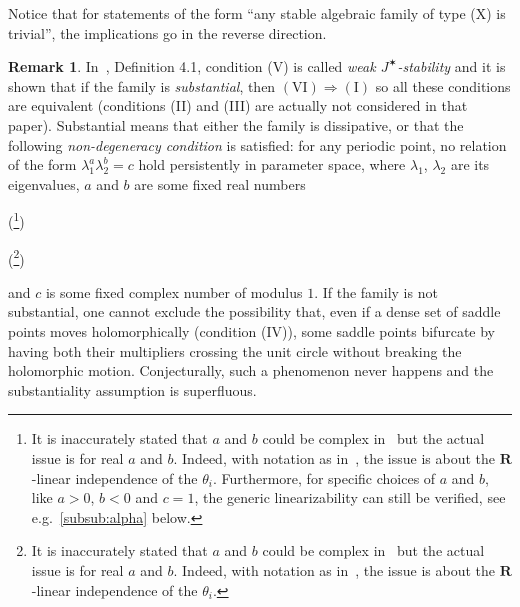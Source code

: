 \documentclass[oneside, 12pt]{amsart}
\newcommand{\abs}[1]{\left\vert#1\right\vert}
\newcommand{\jstar}{J^\varstar}
\newcommand{\R}{\mathbf{R}}
\theoremstyle{plain}
\theoremstyle{definition}
\newtheorem{rem}[thm]{Remark}
\numberwithin{equation}{section}       %
\numberwithin{equation}{section}       %
\begin{document}
Notice  that for    statements  of the form ``any stable algebraic family of type (X) is trivial'', the implications go in the reverse direction.

\begin{rem}
\label{rem:substantiality}
In~\cite{tangencies}, Definition 4.1, condition (V) is called {\emph{weak $\jstar$-stability}} and it is shown that 
if the family is \emph{substantial}, then  $\mathrm{(VI)}\Rightarrow \mathrm{(I)} $ so all these conditions are equivalent (conditions (II) and (III) are actually not considered in that paper). Substantial means that either the family is dissipative, or that 
the following {\emph{non-degeneracy condition}} is satisfied:
for any periodic point, no relation of the form 
   $\lambda_1^a\lambda_2^b = c$ hold persistently in parameter space, where 
  $\lambda_1$, $\lambda_2$ are its eigenvalues, $a$ and $b$ are some fixed real numbers
  \begin{vlongue}
(\footnote{It is inaccurately stated that $a$ and $b$ could be complex in~\cite{tangencies} but the actual issue is for real $a$ and $b$. Indeed, with notation as in~\cite[Lem. 4.11]{tangencies}, the issue is about the $\R$-linear independence of the $\theta_i$. Furthermore, for specific choices of $a$ and $b$, like $a>0$, $b<0$ and $c=1$, the generic linearizability can still be verified, see e.g.~\ref{subsub:alpha} below.})
\end{vlongue}
\begin{vcourte}
(\footnote{It is inaccurately stated that $a$ and $b$ could be complex in~\cite{tangencies} but the actual issue is for real $a$ and $b$. Indeed, with notation as in~\cite[Lem. 4.11]{tangencies}, the issue is about the $\R$-linear independence of the $\theta_i$.})
\end{vcourte}
and  $c$ is some fixed complex number of modulus $1$. %
 If the family is not substantial, one cannot exclude the possibility that, even if a dense set of saddle points moves holomorphically (condition (IV)), some saddle points bifurcate by having both their multipliers crossing the unit circle without breaking the holomorphic motion.  Conjecturally, such a phenomenon never happens and the substantiality assumption is superfluous.   
\end{rem}
\end{document}
